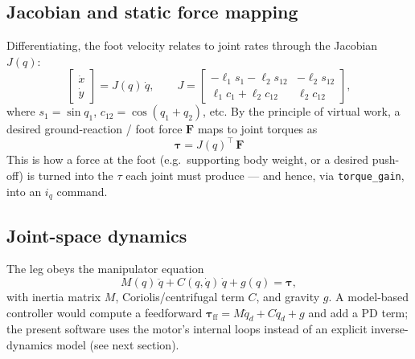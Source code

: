\documentclass[11pt,a4paper]{article}
\newcommand{\code}[1]{\texttt{#1}}
\begin{document}
\subsection{Jacobian and static force mapping}
Differentiating, the foot velocity relates to joint rates through the Jacobian
$J(q)$:
\begin{equation}
  \begin{bmatrix}\dot x\\ \dot y\end{bmatrix}
  = J(q)\,\dot q,\qquad
  J =
  \begin{bmatrix}
   -\ell_1 s_1 - \ell_2 s_{12} & -\ell_2 s_{12}\\
    \ell_1 c_1 + \ell_2 c_{12} &  \ell_2 c_{12}
  \end{bmatrix},
\end{equation}
where $s_1=\sin q_1$, $c_{12}=\cos(q_1+q_2)$, etc. By the principle of virtual
work, a desired ground-reaction / foot force $\mathbf F$ maps to joint torques as
\begin{equation}
  \boxed{\;\boldsymbol\tau = J(q)^{\!\top}\,\mathbf F\;}
\end{equation}
This is how a force at the foot (e.g.\ supporting body weight, or a desired
push-off) is turned into the $\tau$ each joint must produce --- and hence, via
\code{torque\_gain}, into an $i_q$ command.

\subsection{Joint-space dynamics}
The leg obeys the manipulator equation
\begin{equation}
  M(q)\,\ddot q + C(q,\dot q)\,\dot q + g(q) = \boldsymbol\tau,
\end{equation}
with inertia matrix $M$, Coriolis/centrifugal term $C$, and gravity $g$. A
model-based controller would compute a feedforward
$\boldsymbol\tau_{\text{ff}} = M\ddot q_d + C\dot q_d + g$ and add a PD term;
the present software uses the motor's internal loops instead of an explicit
inverse-dynamics model (see next section).
\end{document}
